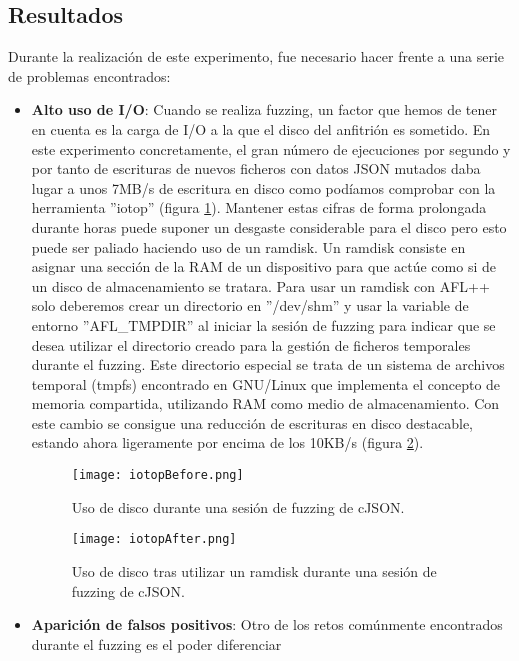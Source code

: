 \subsection{Resultados}
Durante la realización de este experimento, fue necesario hacer frente a una serie de problemas encontrados:
\begin{itemize}
    \item \textbf{Alto uso de I/O}: Cuando se realiza fuzzing, un factor que hemos de tener en cuenta es la carga 
    de I/O a la que el disco del anfitrión es sometido. En este experimento concretamente, el gran número de ejecuciones por 
    segundo y por tanto de escrituras de nuevos ficheros con datos JSON mutados daba lugar a unos 7MB/s de escritura en 
    disco como podíamos comprobar con la herramienta ''iotop'' (figura \ref{fig:iotopBefore}). Mantener estas cifras de forma 
    prolongada durante horas puede suponer un desgaste considerable para el disco pero esto puede ser paliado haciendo uso 
    de un ramdisk. Un ramdisk consiste en asignar una sección de la RAM de un dispositivo para que actúe como si de un disco
    de almacenamiento se tratara. Para usar un ramdisk con AFL++ solo deberemos crear un directorio en ''/dev/shm'' y usar la 
    variable de entorno ''AFL\_TMPDIR'' al iniciar la sesión de fuzzing para indicar que se desea utilizar el directorio creado para 
    la gestión de ficheros temporales durante el fuzzing. Este directorio especial se trata de un sistema de archivos temporal (tmpfs)
    encontrado en GNU/Linux que implementa el concepto de memoria compartida, utilizando RAM como medio de almacenamiento. Con este 
    cambio se consigue una reducción de escrituras en disco destacable, estando ahora ligeramente por encima de los 10KB/s 
    (figura \ref{fig:iotopAfter}).
    \begin{figure}[H]
        \centering
        \texttt{[image: iotopBefore.png]}
        \caption{Uso de disco durante una sesión de fuzzing de cJSON.}
        \label{fig:iotopBefore}
    \end{figure}
    \begin{figure}[H]
        \centering
        \texttt{[image: iotopAfter.png]}
        \caption{Uso de disco tras utilizar un ramdisk durante una sesión de fuzzing de cJSON.}
        \label{fig:iotopAfter}
    \end{figure}
    \item \textbf{Aparición de falsos positivos}: Otro de los retos comúnmente encontrados durante el fuzzing es el poder diferenciar 

\end{itemize}
